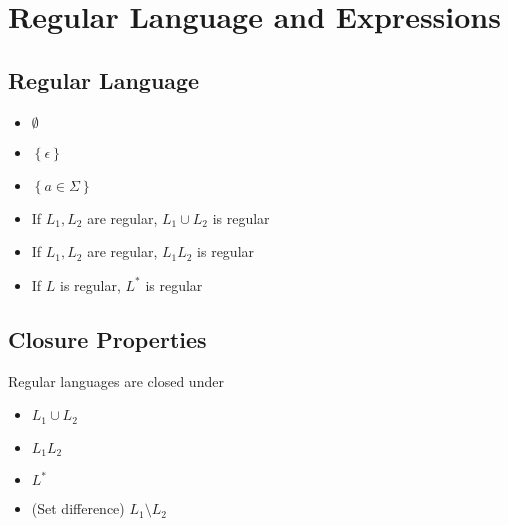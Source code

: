 \chapter{Regular Language and Expressions}

\section{Regular Language}

  \begin{itemize}
    \item $ \emptyset $
    \item $ \left\{ \epsilon \right\} $
    \item $ \left\{ a \in \Sigma \right\} $
    \item If $ L_{1}, L_{2} $ are regular, $ L_{1} \cup L_{2} $ is regular
    \item If $ L_{1}, L_{2} $ are regular, $ L_{1} L_{2} $ is regular
    \item If $ L $ is regular, $ L^{*} $ is regular
  \end{itemize}

\section{Closure Properties}

  Regular languages are closed under

  \begin{itemize}
    \item $ L_{1} \cup L_{2} $
    \item $ L_{1} L_{2} $
    \item $ L^{*} $
    \item (Set difference) $ L_{1} \setminus L_{2} $
  \end{itemize}
